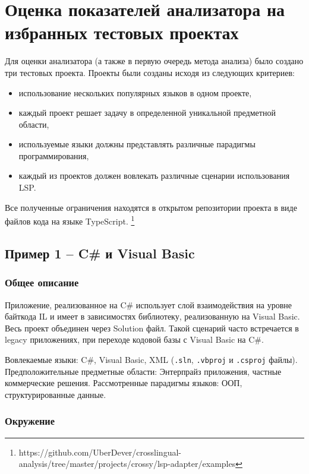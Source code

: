 \chapter{Оценка показателей анализатора на избранных тестовых проектах}

Для оценки анализатора (а также в первую очередь метода анализа) было создано три тестовых проекта.
Проекты были созданы исходя из следующих критериев:
\begin{itemize}
    \item использование нескольких популярных языков в одном проекте,
    \item каждый проект решает задачу в определенной уникальной предметной области,
    \item используемые языки должны представлять различные парадигмы программирования,
    \item каждый из проектов должен вовлекать различные сценарии использования LSP.
\end{itemize}

Все полученные ограничения находятся в открытом репозитории проекта в виде файлов кода на языке TypeScript. \footnote{https://github.com/UberDever/crosslingual-analysis/tree/master/projects/crossy/lsp-adapter/examples}

\section{Пример 1 -- C\# и Visual Basic}

\subsection{Общее описание}

Приложение, реализованное на C\# использует слой взаимодействия на уровне байткода IL и имеет в зависимостях библиотеку,
реализованную на Visual Basic. Весь проект объединен через Solution файл. Такой сценарий часто встречается
в legacy приложениях, при переходе кодовой базы с Visual Basic на C\#.

Вовлекаемые языки: C\#, Visual Basic, XML (\texttt{.sln}, \texttt{.vbproj} и \texttt{.csproj} файлы).
Предположительные предметные области: Энтерпрайз приложения, частные коммерческие решения.
Рассмотренные парадигмы языков: ООП, структурированные данные.

\subsection{Окружение}

